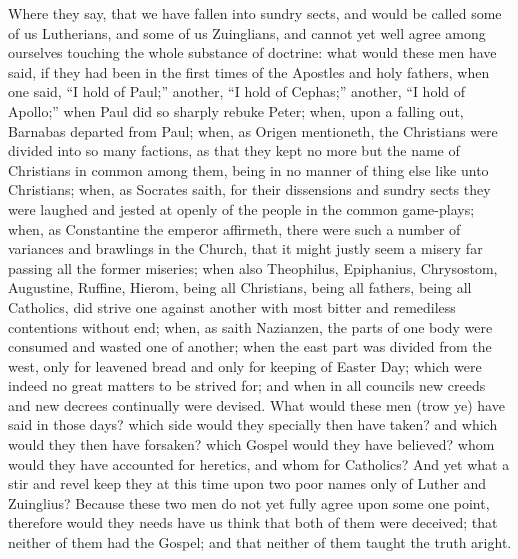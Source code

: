 Where they say, that we have fallen into sundry sects, and would
be called some of us Lutherians, and some of us Zuinglians, and cannot
yet well agree among ourselves touching the whole substance of doctrine:
what would these men have said, if they had been in the first times
of the Apostles and holy fathers, when one said, “I hold of Paul;”
another, “I hold of Cephas;” another, “I hold of Apollo;”
when Paul did so sharply rebuke Peter; when, upon a falling out, Barnabas
departed from Paul; when, as Origen mentioneth, the Christians were
divided into so many factions, as that they kept no more but the name
of Christians in common among them, being in no manner of thing else
like unto Christians; when, as Socrates saith, for
their dissensions and sundry sects they were laughed and jested at openly
of the people in the common game-plays; when, as Constantine the emperor
affirmeth, there were such a number of variances and brawlings in the
Church, that it might justly seem a misery far passing all the former
miseries; when also Theophilus, Epiphanius, Chrysostom, Augustine, Ruffine,
Hierom, being all Christians, being all fathers, being all Catholics,
did strive one against another with most bitter and remediless contentions
without end; when, as saith Nazianzen, the parts of one body were consumed
and wasted one of another; when the east part was divided from the west,
only for leavened bread and only for keeping of Easter Day; which were
indeed no great matters to be strived for; and when in all councils
new creeds and new decrees continually were devised. What would
these men (trow ye) have said in those days? which side would they specially
then have taken? and which would they then have forsaken? which Gospel
would they have believed? whom would they have accounted for heretics,
and whom for Catholics? And yet what a stir and revel keep they
at this time upon two poor names only of Luther and Zuinglius?
Because these two men do not yet fully agree upon some one point, therefore
would
they needs have us think that both of them were deceived; that neither
of them had the Gospel; and that neither of them taught the truth aright.

